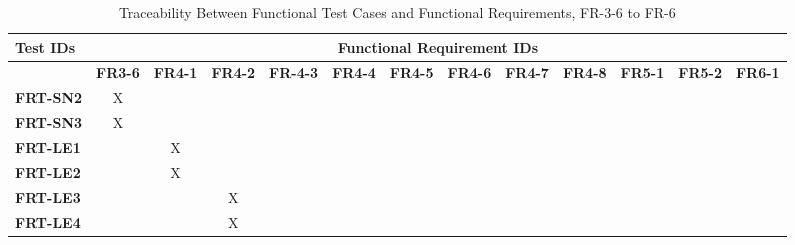 \documentclass[12pt, titlepage]{article}
\begin{document}
\begin{landscape}
	\begin{longtable}{|l|cccccccccccc|}
		\caption{Traceability Between Functional Test Cases and Functional Requirements, FR-3-6 to FR-6}                                                                                                                                                                                                  \\
		\hline
		\textbf{Test IDs}   & \multicolumn{12}{c|}{\textbf{Functional Requirement IDs}}                                                                                                                                                                                                                 \\
		\hline
		~                   & \textbf{FR3-6}  & \textbf{FR4-1}  & \textbf{FR4-2} & \textbf{FR-4-3} & \textbf{FR4-4} & \textbf{FR4-5} & \textbf{FR4-6} & \textbf{FR4-7} & \textbf{FR4-8} &  \textbf{FR5-1} & \textbf{FR5-2} & \textbf{FR6-1} \\
		\hline
		\textbf{FRT-SN2} & X                                                         & ~             & ~             & ~             & ~             & ~             & ~             & ~             & ~             & ~             & ~ &~\\
		\textbf{FRT-SN3} & X                                                         & ~             & ~             & ~             & ~             & ~             & ~             & ~             & ~             & ~             & ~ &~\\
		\textbf{FRT-LE1} & ~                                                         & X             & ~             & ~             & ~             & ~             & ~             & ~             & ~             & ~             & ~ &~\\
		\textbf{FRT-LE2} & ~                                                         & X             & ~             & ~             & ~             & ~             & ~             & ~             & ~             & ~             & ~ &~\\
		\textbf{FRT-LE3} & ~                                                         & ~             & X             & ~             & ~             & ~             & ~             & ~             & ~             & ~             & ~ &~\\
		\textbf{FRT-LE4} & ~                                                         & ~             & X             & ~             & ~             & ~             & ~             & ~             & ~             & ~             & ~ &~\\

\end{longtable}
\end{landscape}
\end{document}
